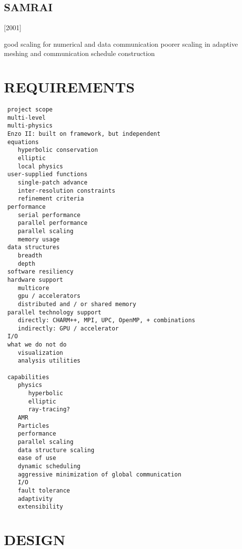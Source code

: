 \documentclass[14pt,letter]{article}
\begin{document}
\subsection{SAMRAI}

[2001]


good scaling for numerical and data communication
poorer scaling in adaptive meshing and communication schedule construction 


\section{REQUIREMENTS } \label{s:requirements}

\begin{verbatim}
 project scope
 multi-level
 multi-physics
 Enzo II: built on framework, but independent
 equations
    hyperbolic conservation
    elliptic
    local physics
 user-supplied functions
    single-patch advance
    inter-resolution constraints
    refinement criteria
 performance
    serial performance
    parallel performance
    parallel scaling
    memory usage
 data structures
    breadth
    depth
 software resiliency
 hardware support
    multicore
    gpu / accelerators
    distributed and / or shared memory
 parallel technology support
    directly: CHARM++, MPI, UPC, OpenMP, + combinations
    indirectly: GPU / accelerator
 I/O
 what we do not do
    visualization
    analysis utilities

 capabilities
    physics
       hyperbolic
       elliptic
       ray-tracing?
    AMR
    Particles
    performance
    parallel scaling
    data structure scaling
    ease of use
    dynamic scheduling
    aggressive minimization of global communication
    I/O
    fault tolerance
    adaptivity
    extensibility
\end{verbatim}

\section{DESIGN} \label{s:design}
\end{document}
